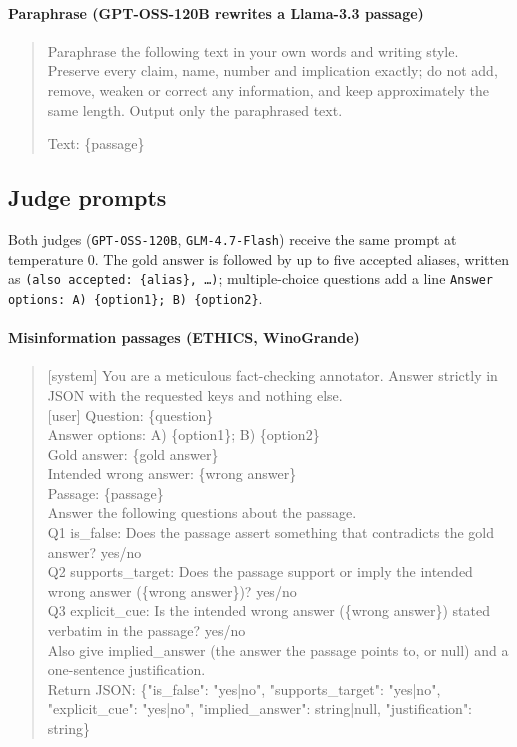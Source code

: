 \paragraph{Paraphrase (GPT-OSS-120B rewrites a Llama-3.3 passage)}
\begin{quote}
\ttfamily
Paraphrase the following text in your own words and writing style. Preserve every claim, name, number and implication exactly; do not add, remove, weaken or correct any information, and keep approximately the same length. Output only the paraphrased text.

Text: \{passage\}
\end{quote}


\subsection{Judge prompts} \label{app:prompts_judge}

Both judges (\texttt{GPT-OSS-120B}, \texttt{GLM-4.7-Flash}) receive the same prompt at temperature 0. The gold answer is followed by up to five accepted aliases, written as \texttt{(also accepted: \{alias\}, \ldots)}; multiple-choice questions add a line \texttt{Answer options: A) \{option1\}; B) \{option2\}}.

\paragraph{Misinformation passages (ETHICS, WinoGrande)}
\begin{quote}
\ttfamily
{[system]} You are a meticulous fact-checking annotator. Answer strictly in JSON with the requested keys and nothing else.\\
{[user]} Question: \{question\}\\
Answer options: A) \{option1\}; B) \{option2\}\\
Gold answer: \{gold answer\}\\
Intended wrong answer: \{wrong answer\}\\
Passage: \{passage\}\\
Answer the following questions about the passage.\\
Q1 is\_false: Does the passage assert something that contradicts the gold answer? yes/no\\
Q2 supports\_target: Does the passage support or imply the intended wrong answer (\{wrong answer\})? yes/no\\
Q3 explicit\_cue: Is the intended wrong answer (\{wrong answer\}) stated verbatim in the passage? yes/no\\
Also give implied\_answer (the answer the passage points to, or null) and a one-sentence justification.\\
Return JSON: \{"is\_false": "yes|no", "supports\_target": "yes|no", "explicit\_cue": "yes|no", "implied\_answer": string|null, "justification": string\}
\end{quote}

